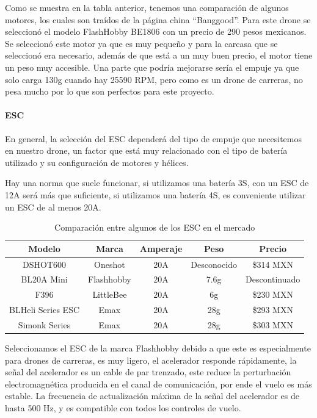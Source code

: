 \documentclass[pdflatex,sn-mathphys-num]{sn-jnl}%
\begin{document}
Como se muestra en la tabla anterior, tenemos una comparación de algunos motores, los cuales son traídos de la página china ``Banggood''. Para este drone se seleccionó el modelo FlashHobby BE1806 con un precio de 290 pesos mexicanos. Se seleccionó este motor ya que es muy pequeño y para la carcasa que se seleccionó era necesario, además de que está a un muy buen precio, el motor tiene un peso muy accesible. Una parte que podría mejorarse sería el empuje ya que solo carga 130g cuando hay 25590 RPM, pero como es un drone de carreras, no pesa mucho por lo que son perfectos para este proyecto.

\paragraph{ESC}

En general, la selección del ESC dependerá del tipo de empuje que necesitemos en nuestro drone, un factor que está muy relacionado con el tipo de batería utilizado y su configuración de motores y hélices.

Hay una norma que suele funcionar, si utilizamos una batería 3S, con un ESC de 12A será más que suficiente, si utilizamos una batería 4S, es conveniente utilizar un ESC de al menos 20A.

\begin{table}[!h]
\centering
\caption{Comparación entre algunos de los ESC en el mercado}
\label{tab:esc_comparison}
\begin{tabular}{|c|c|c|c|c|}
\hline
\textbf{Modelo} & \textbf{Marca} & \textbf{Amperaje} & \textbf{Peso} & \textbf{Precio} \\
\hline
DSHOT600 & Oneshot & 20A & Desconocido & \$314 MXN \\
\hline
BL20A Mini & Flashhobby & 20A & 7.6g & Descontinuado \\
\hline
F396 & LittleBee & 20A & 6g & \$230 MXN \\
\hline
BLHeli Series ESC & Emax & 20A & 28g & \$293 MXN \\
\hline
Simonk Series & Emax & 20A & 28g & \$303 MXN \\
\hline
\end{tabular}
\end{table}

Seleccionamos el ESC de la marca Flashhobby debido a que este es especialmente para drones de carreras, es muy ligero, el acelerador responde rápidamente, la señal del acelerador es un cable de par trenzado, este reduce la perturbación electromagnética producida en el canal de comunicación, por ende el vuelo es más estable. La frecuencia de actualización máxima de la señal del acelerador es de hasta 500 Hz, y es compatible con todos los controles de vuelo.
\end{document}
